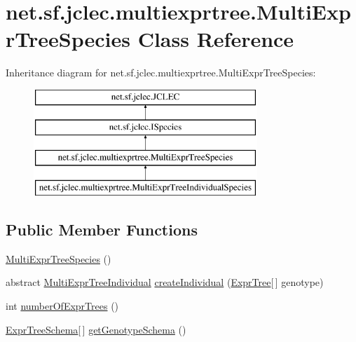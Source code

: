 \hypertarget{classnet_1_1sf_1_1jclec_1_1multiexprtree_1_1_multi_expr_tree_species}{\section{net.\-sf.\-jclec.\-multiexprtree.\-Multi\-Expr\-Tree\-Species Class Reference}
\label{classnet_1_1sf_1_1jclec_1_1multiexprtree_1_1_multi_expr_tree_species}
}
Inheritance diagram for net.\-sf.\-jclec.\-multiexprtree.\-Multi\-Expr\-Tree\-Species\-:\begin{figure}[H]
\begin{center}
\leavevmode
\includegraphics[height=4.000000cm]{classnet_1_1sf_1_1jclec_1_1multiexprtree_1_1_multi_expr_tree_species}
\end{center}
\end{figure}
\subsection*{Public Member Functions}
\begin{DoxyCompactItemize}
\item 
\hyperlink{classnet_1_1sf_1_1jclec_1_1multiexprtree_1_1_multi_expr_tree_species_a695cdcf5144b35c9067283cc6eebdda4}{Multi\-Expr\-Tree\-Species} ()
\item 
abstract \hyperlink{classnet_1_1sf_1_1jclec_1_1multiexprtree_1_1_multi_expr_tree_individual}{Multi\-Expr\-Tree\-Individual} \hyperlink{classnet_1_1sf_1_1jclec_1_1multiexprtree_1_1_multi_expr_tree_species_a42f632d3ba89a0fed5eba01590adacb8}{create\-Individual} (\hyperlink{classnet_1_1sf_1_1jclec_1_1exprtree_1_1_expr_tree}{Expr\-Tree}\mbox{[}$\,$\mbox{]} genotype)
\item 
int \hyperlink{classnet_1_1sf_1_1jclec_1_1multiexprtree_1_1_multi_expr_tree_species_a81e4888a9e6ad9b73e94a1c8bfbc1f47}{number\-Of\-Expr\-Trees} ()
\item 
\hyperlink{classnet_1_1sf_1_1jclec_1_1exprtree_1_1_expr_tree_schema}{Expr\-Tree\-Schema}\mbox{[}$\,$\mbox{]} \hyperlink{classnet_1_1sf_1_1jclec_1_1multiexprtree_1_1_multi_expr_tree_species_a2841ef19d175c21d8980619081a672a0}{get\-Genotype\-Schema} ()
\end{DoxyCompactItemize}
